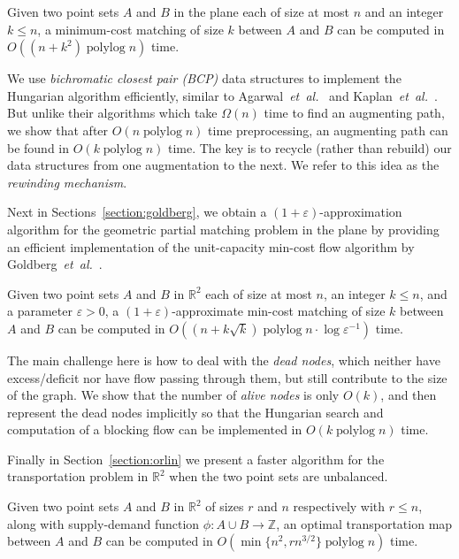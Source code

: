 \documentclass[11pt]{article}
\def\etal{\emph{et~al.}}
\def\etal{\textit{et~al.}}
\def\polylog{\mathop{\mathrm{polylog}}}
\def\eps{\varepsilon}
\def\reals{\mathbb{R}}
\def\ints{\mathbb{Z}}
\def\tsupply{\phi}
\theoremstyle{plain}
\numberwithin{figure}{section}
\begin{document}
\begin{theorem}
\label{theorem:hung}
Given two point sets $A$ and $B$ in the plane each of size at most $n$ and an
integer $k \leq n$, a minimum-cost matching of size $k$ between $A$ and $B$ can
be computed in $O((n + k^2)\polylog n)$ time.
\end{theorem}

We use \emph{bichromatic closest pair (BCP)} data structures to implement the Hungarian algorithm efficiently, similar to Agarwal~\etal~\cite{AES99} and Kaplan~\etal~\cite{KMRSS17}.
But unlike their algorithms which take $\Omega(n)$ time to find an
augmenting path, we show that after $O(n\polylog n)$ time preprocessing,
an augmenting path can be found in $O(k\polylog n)$ time.
The key is to recycle (rather than rebuild) our data structures from one
augmentation to the next.
We refer to this idea as the \emph{rewinding mechanism}.

\medskip

Next in Sections~\ref{section:goldberg},
we obtain a $(1+\eps)$-approximation algorithm for the geometric partial
matching problem in the plane by providing an efficient implementation of the
unit-capacity min-cost flow algorithm by Goldberg~\etal~\cite{GHKT17}.

\begin{theorem}
\label{theorem:gmcm}
Given two point sets $A$ and $B$ in $\reals^2$ each of size at most $n$,
an integer $k \leq n$, and a parameter $\eps > 0$, a $(1+\eps)$-approximate
min-cost matching of size $k$ between $A$ and $B$ can be computed in
$O((n + k\sqrt{k})\polylog n \cdot \log\eps^{-1})$ time.
\end{theorem}

The main challenge here is how to deal with the \emph{dead nodes},
which neither have excess/deficit nor have flow passing through them,
but still contribute to the size of the graph.
We show that the number of \emph{alive nodes} is only $O(k)$, and then
represent the dead nodes implicitly so that the Hungarian search and
computation of a blocking flow can be implemented in $O(k\polylog n)$ time.

\medskip

Finally in Section~\ref{section:orlin} we present a faster algorithm for the
transportation problem in $\reals^2$ when the two point sets are unbalanced.

\begin{theorem}
\label{theorem:orlin}
Given two point sets $A$ and $B$ in $\reals^2$ of sizes $r$ and $n$ respectively
with $r \leq n$, along with supply-demand function $\tsupply:A \cup B \to \ints$,
an optimal transportation map between $A$ and $B$ can be computed in
$O(\min\{n^2, rn^{3/2}\}\polylog n)$ time.
\end{theorem}
\end{document}
